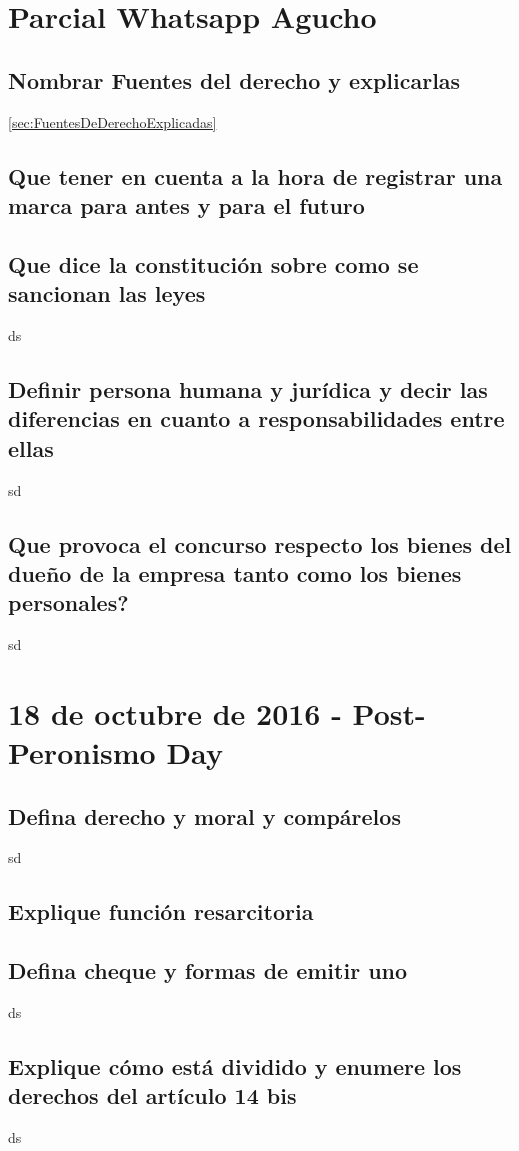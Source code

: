\documentclass{article}
\begin{document}
\section{Parcial Whatsapp Agucho}
\subsection{Nombrar Fuentes del derecho y explicarlas}
\ref{sec:FuentesDeDerechoExplicadas}
\subsection{Que tener en cuenta a la hora de registrar una marca para antes y para el futuro}

\subsection{Que dice la constitución sobre como se sancionan las leyes}
ds
\subsection{Definir persona humana y jurídica y decir las diferencias en cuanto a responsabilidades entre ellas}
sd
\subsection{Que provoca el concurso respecto los bienes del dueño de la empresa tanto como los bienes personales?}
sd


\section{18 de octubre de 2016 - Post-Peronismo Day}
\subsection{Defina derecho y moral y  compárelos}
sd
\subsection{Explique función resarcitoria}

\subsection{Defina cheque y formas de emitir uno}
ds
\subsection{Explique cómo está dividido y enumere los derechos del artículo 14 bis}
ds
\end{document}
